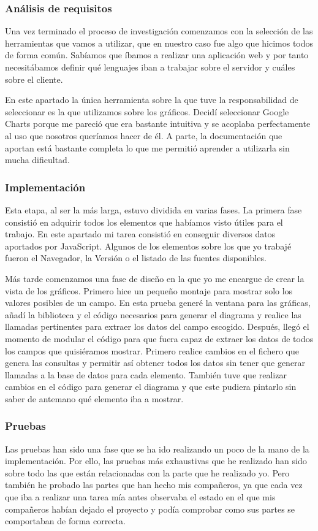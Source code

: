 \subsubsection{Análisis de requisitos}
Una vez terminado el proceso de investigación comenzamos con la selección de las herramientas que vamos a utilizar, que en nuestro caso fue algo que hicimos todos de forma común. Sabíamos que íbamos a realizar una aplicación web y por tanto necesitábamos definir qué lenguajes iban a trabajar sobre el servidor y cuáles sobre el cliente. \par
En este apartado la única herramienta sobre la que tuve la responsabilidad de seleccionar es la que utilizamos sobre los gráficos. Decidí seleccionar Google Charts porque me pareció que era bastante intuitiva y se acoplaba perfectamente al uso que nosotros queríamos hacer de él. A parte, la documentación que aportan está bastante completa lo que me permitió aprender a utilizarla sin mucha dificultad.

\subsubsection{Implementación}
Esta etapa, al ser la más larga, estuvo dividida en varias fases. La primera fase consistió en adquirir todos los elementos que habíamos visto útiles para el trabajo. En este apartado mi tarea consistió en conseguir diversos datos aportados por JavaScript. Algunos de los elementos sobre los que yo trabajé fueron el Navegador, la Versión o el listado de las fuentes disponibles. \par
Más tarde comenzamos una fase de diseño en la que yo me encargue de crear la vista de los gráficos. Primero hice un pequeño montaje para mostrar solo los valores posibles de un campo. En esta prueba generé la ventana para las gráficas, añadí la biblioteca y el código necesarios para generar el diagrama y realice las llamadas pertinentes para extraer los datos del campo escogido. Después, llegó el momento de modular el código para que fuera capaz de extraer los datos de todos los campos que quisiéramos mostrar. Primero realice cambios en el fichero que genera las consultas y permitir así obtener todos los datos sin tener que generar llamadas a la base de datos para cada elemento. También tuve que realizar cambios en el código para generar el diagrama y que este pudiera pintarlo sin saber de antemano qué elemento iba a mostrar.

\subsubsection{Pruebas}
Las pruebas han sido una fase que se ha ido realizando un poco de la mano de la implementación. Por ello, las pruebas más exhaustivas que he realizado han sido sobre todo las que están relacionadas con la parte que he realizado yo. Pero también he probado las partes que han hecho mis compañeros, ya que cada vez que iba a realizar una tarea mía antes observaba el estado en el que mis compañeros habían dejado el proyecto y podía comprobar como sus partes se comportaban de forma correcta.
